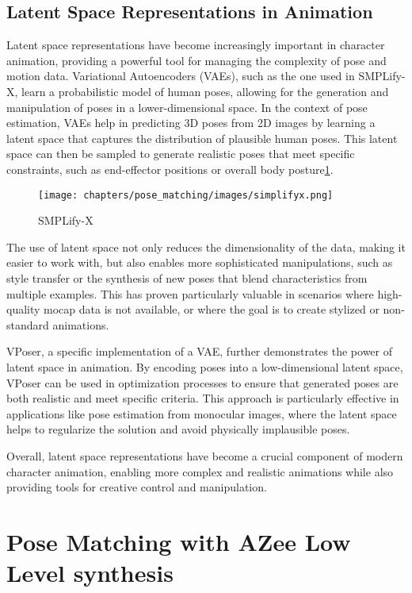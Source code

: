 \documentclass[../../main.tex]{subfiles}
\begin{document}
\subsection{Latent Space Representations in Animation}

Latent space representations have become increasingly important in character animation, providing a powerful tool for managing the complexity of pose and motion data. Variational Autoencoders (VAEs)\cite{TODO}, such as the one used in SMPLify-X\cite{TODO}, learn a probabilistic model of human poses, allowing for the generation and manipulation of poses in a lower-dimensional space. In the context of pose estimation, VAEs help in predicting 3D poses from 2D images by learning a latent space that captures the distribution of plausible human poses. This latent space can then be sampled to generate realistic poses that meet specific constraints, such as end-effector positions or overall body posture\ref{fig:simplifyx}.

\begin{figure}
  \centering \texttt{[image: chapters/pose\_matching/images/simplifyx.png]}
  \caption{SMPLify-X}
  \label{fig:simplifyx}
\end{figure}

The use of latent space not only reduces the dimensionality of the data, making it easier to work with, but also enables more sophisticated manipulations, such as style transfer or the synthesis of new poses that blend characteristics from multiple examples. This has proven particularly valuable in scenarios where high-quality mocap data is not available, or where the goal is to create stylized or non-standard animations.

VPoser\cite{TODO}, a specific implementation of a VAE, further demonstrates the power of latent space in animation. By encoding poses into a low-dimensional latent space, VPoser can be used in optimization processes to ensure that generated poses are both realistic and meet specific criteria. This approach is particularly effective in applications like pose estimation from monocular images, where the latent space helps to regularize the solution and avoid physically implausible poses.

Overall, latent space representations have become a crucial component of modern character animation, enabling more complex and realistic animations while also providing tools for creative control and manipulation.

\section{Pose Matching with AZee Low Level synthesis}
\end{document}
